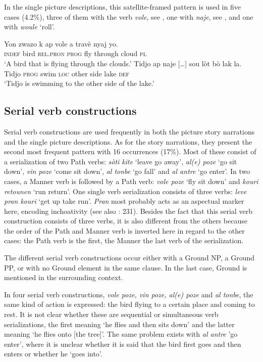\documentclass[output=paper,colorlinks,citecolor=brown]{langscibook}
\begin{document}
In the single picture descriptions, this satellite-framed pattern is used in five cases (4.2\%), three of them with the verb \emph{vole}, see , one with \emph{naje}, see , and one with \emph{woule} ‘roll’.

\ea\label{ex:3:55}
\gll Yon zwazo k ap vole a travè nyaj yo. \\
     \textsc{indef} bird \textsc{rel.pron} \textsc{prog} fly through cloud \textsc{pl} \\
\glt ‘A bird that is flying through the clouds.’
\ex\label{ex:3:56}
\gll    Tidjo ap naje {[}…{]} sou lòt bò lak la. \\
        Tidjo \textsc{prog} swim  {} \textsc{loc} other side lake  \textsc{def}\\
\glt ‘Tidjo is swimming to the other side of the lake.’
\z

\subsection{Serial verb constructions}

Serial verb constructions are used frequently in both the picture story narrations and the single picture descriptions. As for the story narrations, they present the second most frequent pattern with 16 occurrences (17\%). Most of these consist of a serialization of two Path verbs: \emph{sòti kite} ‘leave go away’, \emph{al(e) poze} `go sit down', \emph{vin poze} `come sit down', \emph{al tonbe} ‘go fall’ and \emph{al antre} ‘go enter’. In two cases, a Manner verb is followed by a Path verb: \emph{vole poze} ‘fly sit down’ and \emph{kouri retounen} ‘run return’. One single verb serialization consists of three verbs: \emph{leve pran kouri} ‘get up take run’. \emph{Pran} most probably acts as an aspectual marker here, encoding inchoativity (see also \cite{Valdman_2015}: 231). Besides the fact that this serial verb construction consists of three verbs, it is also different from the others because the order of the Path and Manner verb is inverted here in regard to the other cases: the Path verb is the first, the Manner the last verb of the serialization.

\hspace*{-2.8pt}The different serial verb constructions occur either with a Ground NP, a Ground PP, or with no Ground element in the same clause. In the last case, Ground is mentioned in the surrounding context.

In four serial verb constructions, \emph{vole poze, vin poze, al(e) poze} and \emph{al tonbe}, the same kind of action is expressed: the bird flying to a certain place and coming to rest. It is not clear whether these are sequential or simultaneous verb serializations, the first meaning ‘he flies and then sits down’ and the latter meaning ‘he flies onto [the tree]’. The same problem exists with \emph{al antre} 'go enter', where it is unclear whether it is said that the bird first goes and then enters or whether he ‘goes into’. 
\end{document}
